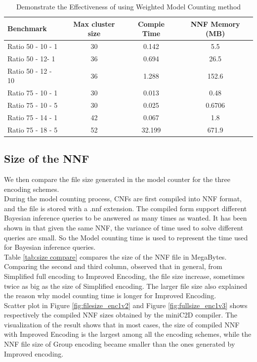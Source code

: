 \begin{table}[]
    \centering
    \begin{tabular}{l|c c c}
	\hline
   Benchmark					&	Max cluster size	&	Compie Time	&	NNF Memory (MB)	\\
   \hline
   \hline
    Ratio 50	-	10	-	1	&	30	&	0.142	&	5.5	\\
    Ratio 50	-	12-	1	&	36	&	0.694	&	26.5	\\
    Ratio 50	-	12	-	10	&	36	&	1.288	&	152.6	\\
    Ratio 75	-	10	-	1	&	30	&	0.013	&	0.48	\\
    Ratio 75	-	10	-	5	&	30	&	0.025	&	0.6706	\\
    Ratio 75	-	14	-	1	&	42	&	0.067	&	1.8	\\
    Ratio 75	-	18	-	5	&	52	&	32.199	&	671.9	\\
        \hline
    \end{tabular}
    \caption{Demonstrate the Effectiveness of using Weighted Model Counting method}
    \label{tab:treesize}
\end{table}

\subsection{Size of the NNF}
We then compare the file size generated in the model counter for the three encoding schemes. \\

\noindent During the model counting process, CNFs are first compiled into NNF format, and the file is stored with a .nnf extension. The compiled form support different Bayesian inference queries to be answered as many times as wanted. It has been shown in \cite{2008-literature-review} that given the same NNF, the variance of time used to solve different queries are small. So the Model counting time is used to represent the time used for Bayesian inference queries.\\

\noindent Table \ref{tab:size compare} compares the size of the NNF file in MegaBytes. Comparing the second and third column, observed that in general, from Simplified full encoding to Improved Encoding, the file size increase, sometimes twice as big as the size of Simplified encoding.
The larger file size also explained the reason why model counting time is longer for Improved Encoding.\\

\noindent Scatter plot in Figure \ref{fig:filesize_enc1v2} and Figure  \ref{fig:fullsize_enc1v3} shows respectively the compiled NNF sizes obtained by the miniC2D compiler. The visualization of the result shows that in most cases, the size of compiled NNF with Improved Encoding is the largest among all the encoding schemes, while the NNF file size of Group encoding became smaller than the ones generated by Improved encoding.

